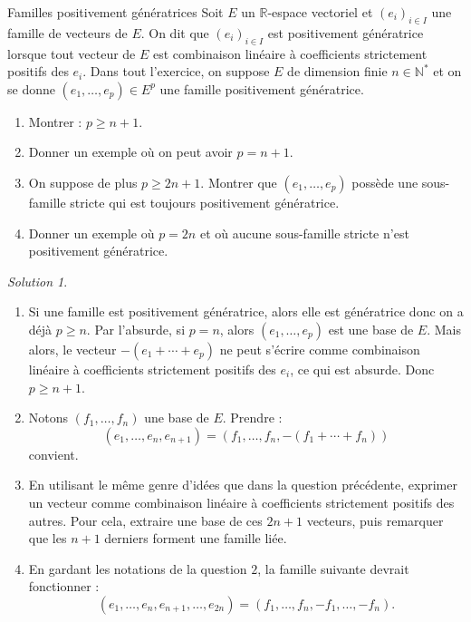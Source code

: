 \documentclass[french]{book}
\newcommand{\N}{\mathbb{N}}
\newcommand{\R}{\mathbb{R}}
\newcommand{\st}{^*}
\theoremstyle{definition}
\theoremstyle{remark}
\newtheorem*{sol}{Solution}
\begin{document}
\begin{exo}[2]{Familles positivement génératrices}
	Soit $E$ un $\R$-espace vectoriel et $(e_i)_{i\in I}$ une famille de vecteurs de $E$. On dit que $(e_i)_{i\in I}$ est positivement génératrice lorsque tout vecteur de $E$ est combinaison linéaire à coefficients strictement positifs des $e_i$. Dans tout l'exercice, on suppose $E$ de dimension finie $n\in\N\st$ et on se donne $(e_1,\ldots,e_p)\in E^p$ une famille positivement génératrice.
	\begin{enumerate}
		\item Montrer : $p\geqslant n+1$.
		\item Donner un exemple où on peut avoir $p=n+1$.
		\item On suppose de plus $p\geqslant 2n+1$. Montrer que $(e_1,\ldots,e_p)$ possède une sous-famille stricte qui est toujours positivement génératrice.
		\item Donner un exemple où $p=2n$ et où aucune sous-famille stricte n'est positivement génératrice.
	\end{enumerate}
\end{exo}
\begin{sol}
	\begin{enumerate}
		\item Si une famille est positivement génératrice, alors elle est génératrice donc on a déjà $p\geqslant n$. Par l'absurde, si $p=n$, alors $(e_1,\ldots,e_p)$ est une base de $E$. Mais alors, le vecteur $-(e_1+\cdots+e_p)$ ne peut s'écrire comme combinaison linéaire à coefficients strictement positifs des $e_i$, ce qui est absurde. Donc $p\geqslant n+1$.
		\item Notons $(f_1,\ldots,f_n)$ une base de $E$. Prendre :
		$$(e_1,\ldots,e_n,e_{n+1})=(f_1,\ldots,f_n,-(f_1+\cdots+f_n))$$ convient.
		\item En utilisant le même genre d'idées que dans la question précédente, exprimer un vecteur comme combinaison linéaire à coefficients strictement positifs des autres. Pour cela, extraire une base de ces $2n+1$ vecteurs, puis remarquer que les $n+1$ derniers forment une famille liée.
		\item En gardant les notations de la question $2$, la famille suivante devrait fonctionner :
		$$(e_1,\ldots,e_n,e_{n+1},\ldots,e_{2n})=(f_1,\ldots,f_n,-f_1,\ldots,-f_n).$$
	\end{enumerate}
\end{sol}
\end{document}
